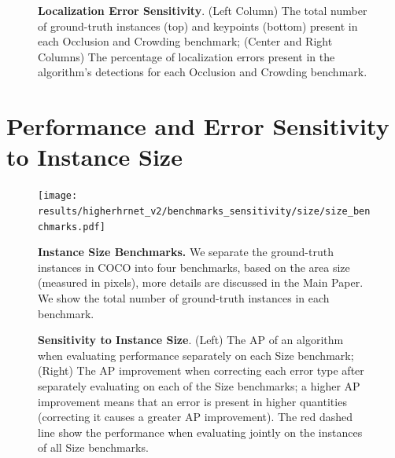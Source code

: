 \documentclass[10pt,onecolumn,letterpaper]{article}
\begin{document}
\vspace{-3mm}
\begin{figure}[h!]
\centering
{}
\caption{ {\small \textbf{Localization Error Sensitivity}. (Left Column) The total number of ground-truth instances (top) and keypoints (bottom) present
 in each Occlusion and Crowding benchmark; (Center and Right Columns) The percentage of localization errors present in the algorithm's detections for each Occlusion and Crowding benchmark.}}
\end{figure}
\clearpage

\section{Performance and Error Sensitivity to Instance Size}

\begin{figure}[h!]
\centering
\texttt{[image: results/higherhrnet\_v2/benchmarks\_sensitivity/size/size\_benchmarks.pdf]}
\caption{ {\small \textbf{Instance Size Benchmarks.} We separate the ground-truth instances in COCO into four benchmarks, based on the area size (measured in pixels),
more details are discussed in the Main Paper. We show the total number of ground-truth instances in each benchmark.}}
\end{figure}

\begin{figure}[h!]
\centering
{}
\caption{ {\small \textbf{Sensitivity to Instance Size}.
(Left) The AP of an algorithm when evaluating performance separately on each Size benchmark;
(Right) The AP improvement when correcting each error type after separately evaluating on each of the Size benchmarks;
a higher AP improvement means that an error is present in higher quantities (correcting it causes a greater AP improvement).
The red dashed line show the performance when evaluating jointly on the instances of all Size benchmarks.}}
\end{figure}
\end{document}

